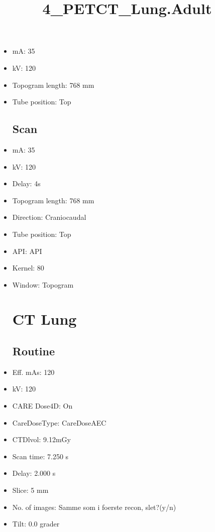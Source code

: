\documentclass[12pt]{article}
\title{4\_PETCT\_Lung.Adult}
\begin{document}
\maketitle
\newpage
\tableofcontents
\newpage
{}


\begin{itemize}\section{Topogram}
\subsection{Routine}
\item mA: 35\item kV: 120\item Topogram length: 768 mm\item Tube position: Top
\subsection{Scan}\item mA: 35\item kV: 120\item Delay: 4s\item Topogram length: 768 mm\item Direction: Craniocaudal\item Tube position: Top\item API: API \item Kernel: 80\item Window: Topogram
\section{CT Lung}
\subsection{Routine}
\item Eff. mAs: 120\item kV: 120\item CARE Dose4D: On\item CareDoseType: CareDoseAEC\item CTDlvol: 9.12mGy\item Scan time: 7.250 s\item Delay: 2.000 s\item Slice: 5 mm\item No. of images: Samme som i foerste recon, slet?(y/n)\item Tilt: 0.0 grader

\end{itemize}
\end{document}
